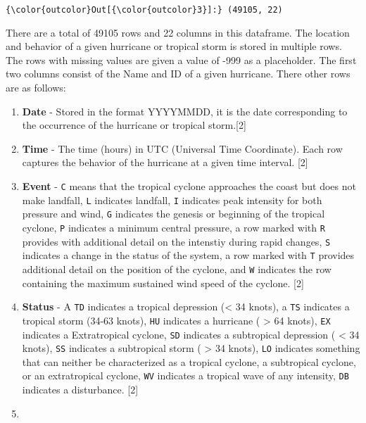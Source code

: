 \documentclass[11pt]{article}
\begin{document}
\begin{Verbatim}[commandchars=\\\{\}]
{\color{outcolor}Out[{\color{outcolor}3}]:} (49105, 22)
\end{Verbatim}
            
    There are a total of 49105 rows and 22 columns in this dataframe. The
location and behavior of a given hurricane or tropical storm is stored
in multiple rows. The rows with missing values are given a value of -999
as a placeholder. The first two columns consist of the Name and ID of a
given hurricane. There other rows are as follows:

\begin{enumerate}
\def\labelenumi{\arabic{enumi}.}
\item
  \textbf{Date} - Stored in the format YYYYMMDD, it is the date
  corresponding to the occurrence of the hurricane or tropical
  storm.{[}2{]}
\item
  \textbf{Time} - The time (hours) in UTC (Universal Time Coordinate).
  Each row captures the behavior of the hurricane at a given time
  interval. {[}2{]}
\item
  \textbf{Event} - \texttt{C} means that the tropical cyclone approaches
  the coast but does not make landfall, \texttt{L} indicates landfall,
  \texttt{I} indicates peak intensity for both pressure and wind,
  \texttt{G} indicates the genesis or beginning of the tropical cyclone,
  \texttt{P} indicates a minimum central pressure, a row marked with
  \texttt{R} provides with additional detail on the intenstiy during
  rapid changes, \texttt{S} indicates a change in the status of the
  system, a row marked with \texttt{T} provides additional detail on the
  position of the cyclone, and \texttt{W} indicates the row containing
  the maximum sustained wind speed of the cyclone. {[}2{]}
\item
  \textbf{Status} - A \texttt{TD} indicates a tropical depression
  (\textless{} 34 knots), a \texttt{TS} indicates a tropical storm
  (34-63 knots), \texttt{HU} indicates a hurricane ( \textgreater{} 64
  knots), \texttt{EX} indicates a Extratropical cyclone, \texttt{SD}
  indicates a subtropical depression ( \textless{} 34 knots),
  \texttt{SS} indicates a subtropical storm ( \textgreater{} 34 knots),
  \texttt{LO} indicates something that can neither be characterized as a
  tropical cyclone, a subtropical cyclone, or an extratropical cyclone,
  \texttt{WV} indicates a tropical wave of any intensity, \texttt{DB}
  indicates a disturbance. {[}2{]}
\item

\end{enumerate}
\end{document}
